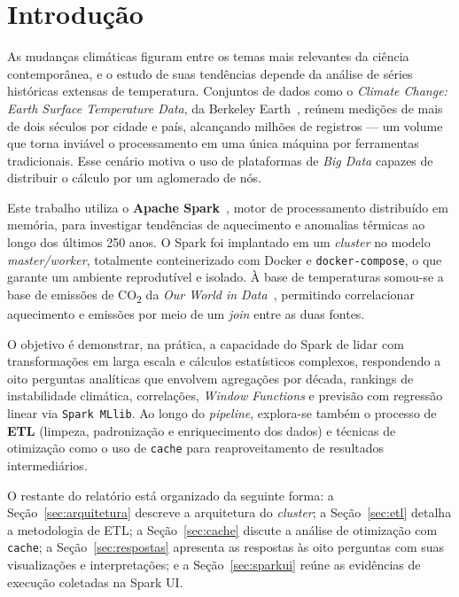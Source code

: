 \section{Introdução}
\label{sec:introducao}

As mudanças climáticas figuram entre os temas mais relevantes da ciência contemporânea, e
o estudo de suas tendências depende da análise de séries históricas extensas de
temperatura. Conjuntos de dados como o \emph{Climate Change: Earth Surface Temperature
Data}, da Berkeley Earth~\citep{databerkeley}, reúnem medições de mais de dois séculos por
cidade e país, alcançando milhões de registros --- um volume que torna inviável o
processamento em uma única máquina por ferramentas tradicionais. Esse cenário motiva o uso
de plataformas de \emph{Big Data} capazes de distribuir o cálculo por um aglomerado de
nós.

Este trabalho utiliza o \textbf{Apache Spark}~\citep{sparkdocs}, motor de processamento
distribuído em memória, para investigar tendências de aquecimento e anomalias térmicas ao
longo dos últimos 250 anos. O Spark foi implantado em um \emph{cluster} no modelo
\emph{master/worker}, totalmente conteinerizado com Docker e \texttt{docker-compose}, o que
garante um ambiente reprodutível e isolado. À base de temperaturas somou-se a base de
emissões de CO\textsubscript{2} da \emph{Our World in Data}~\citep{dataowid}, permitindo
correlacionar aquecimento e emissões por meio de um \emph{join} entre as duas fontes.

O objetivo é demonstrar, na prática, a capacidade do Spark de lidar com transformações em
larga escala e cálculos estatísticos complexos, respondendo a oito perguntas analíticas
que envolvem agregações por década, rankings de instabilidade climática, correlações,
\emph{Window Functions} e previsão com regressão linear via \texttt{Spark MLlib}. Ao longo
do \emph{pipeline}, explora-se também o processo de \textbf{ETL} (limpeza, padronização e
enriquecimento dos dados) e técnicas de otimização como o uso de \texttt{cache} para
reaproveitamento de resultados intermediários.

O restante do relatório está organizado da seguinte forma: a Seção~\ref{sec:arquitetura}
descreve a arquitetura do \emph{cluster}; a Seção~\ref{sec:etl} detalha a metodologia de
ETL; a Seção~\ref{sec:cache} discute a análise de otimização com \texttt{cache}; a
Seção~\ref{sec:respostas} apresenta as respostas às oito perguntas com suas visualizações e
interpretações; e a Seção~\ref{sec:sparkui} reúne as evidências de execução coletadas na
Spark UI.
